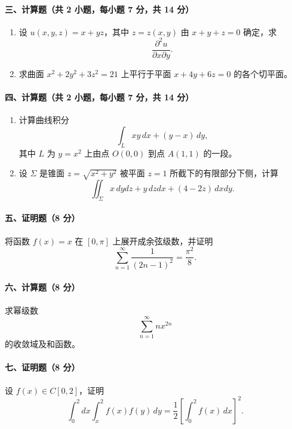 \paragraph{三、计算题（共 2 小题，每小题 7 分，共 14 分）}

\begin{enumerate}
  \item 设 $u(x,y,z)=x+yz$，其中 $z=z(x,y)$ 由 $x+y+z=0$ 确定，求
  \[
    \frac{\partial^2u}{\partial x\partial y}.
  \]

  \item 求曲面 $x^2+2y^2+3z^2=21$ 上平行于平面 $x+4y+6z=0$ 的各个切平面。
\end{enumerate}

\paragraph{四、计算题（共 2 小题，每小题 7 分，共 14 分）}

\begin{enumerate}
  \item 计算曲线积分
  \[
    \int_L xy\,dx+(y-x)\,dy,
  \]
  其中 $L$ 为 $y=x^2$ 上由点 $O(0,0)$ 到点 $A(1,1)$ 的一段。

  \item 设 $\Sigma$ 是锥面 $z=\sqrt{x^2+y^2}$ 被平面 $z=1$ 所截下的有限部分下侧，计算
  \[
    \iint_{\Sigma}x\,dydz+y\,dzdx+(4-2z)\,dxdy.
  \]
\end{enumerate}

\paragraph{五、证明题（8 分）}

将函数 $f(x)=x$ 在 $[0,\pi]$ 上展开成余弦级数，并证明
\[
  \sum_{n=1}^{\infty}\frac1{(2n-1)^2}=\frac{\pi^2}{8}.
\]

\paragraph{六、计算题（8 分）}

求幂级数
\[
  \sum_{n=1}^{\infty}n x^{2n}
\]
的收敛域及和函数。

\paragraph{七、证明题（8 分）}

设 $f(x)\in C[0,2]$，证明
\[
  \int_0^2 dx\int_x^2 f(x)f(y)\,dy
  =
  \frac12\left[\int_0^2 f(x)\,dx\right]^2.
\]

